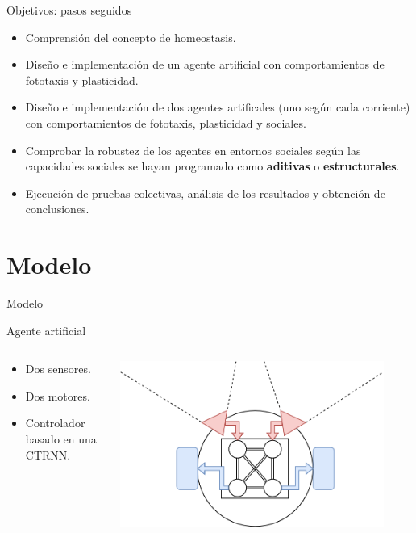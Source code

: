 \documentclass[aspectratio=169]{beamer}
\begin{document}
\begin{frame}{Objetivos: pasos seguidos}
  \begin{itemize}
  \item {Comprensión del concepto de homeostasis.}
  \item {Diseño e implementación de un agente artificial con comportamientos de fototaxis y plasticidad.}
  \item {Diseño e implementación de dos agentes artificales (uno según cada corriente) con comportamientos de fototaxis, plasticidad y sociales.}
  \item {Comprobar la robustez de los agentes en entornos sociales según las capacidades sociales se hayan programado como \textbf{aditivas} o \textbf{estructurales}.}
  \item {Ejecución de pruebas colectivas, análisis de los resultados y obtención de conclusiones.}
  \end{itemize}
\end{frame}

\section{Modelo}
\begin{frame}{Modelo}
\begin{block}{Agente artificial}
  \begin{columns}
    \begin{column}{0.47\textwidth}
        \begin{itemize}
            \item Dos sensores.
            \item Dos motores.
            \item Controlador basado en una CTRNN.
        \end{itemize}
    \end{column}
    \begin{column}{0.5\textwidth}
        \includegraphics[width=0.9\textwidth,height=.35\textheight]{Imagenes/AgentSchema}
    \end{column}
\end{columns}
\end{block}
\end{frame}
\end{document}
